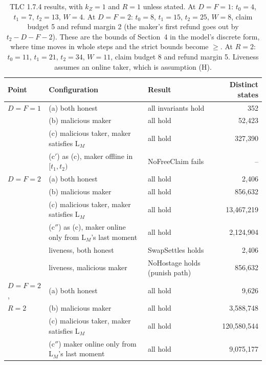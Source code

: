 \documentclass[10pt,letterpaper]{article}
\theoremstyle{plain}
\theoremstyle{definition}
\newcommand{\TLCa}{352}\newcommand{\TLCb}{52{,}423}\newcommand{\TLCc}{327{,}390}
\newcommand{\TLCda}{2{,}406}\newcommand{\TLCdl}{2{,}124{,}904}\newcommand{\TLCdb}{856{,}632}\newcommand{\TLCdc}{13{,}467{,}219}
\begin{document}
\begin{table}[H]
\centering\small
\begin{tabular}{@{}lllr@{}}
\toprule
\textbf{Point} & \textbf{Configuration} & \textbf{Result} & \textbf{Distinct states}\\
\midrule
$D=F=1$ & (a) both honest & all invariants hold & \TLCa\\
 & (b) malicious maker & all hold & \TLCb\\
 & (c) malicious taker, maker satisfies L$_M$ & all hold & \TLCc\\
 & (c$'$) as (c), maker offline in $[t_1,t_2)$ & NoFreeClaim fails & --\\
\midrule
$D=F=2$ & (a) both honest & all hold & \TLCda\\
 & (b) malicious maker & all hold & \TLCdb\\
 & (c) malicious taker, maker satisfies L$_M$ & all hold & \TLCdc\\
 & (c$''$) as (c), maker online only from L$_M$'s last moment & all hold & \TLCdl\\
 & liveness, both honest & SwapSettles holds & 2{,}406\\
 & liveness, malicious maker & NoHostage holds (punish path) & 856{,}632\\
\midrule
$D=F=2$, & (a) both honest & all hold & 9{,}626\\
$R=2$ & (b) malicious maker & all hold & 3{,}588{,}748\\
 & (c) malicious taker, maker satisfies L$_M$ & all hold & 120{,}580{,}544\\
 & (c$''$) maker online only from L$_M$'s last moment & all hold & 9{,}075{,}177\\
\bottomrule
\end{tabular}
\caption{TLC 1.7.4 results, with $k_Z=1$ and $R=1$ unless stated. At $D=F=1$: $t_0=4$, $t_1=7$, $t_2=13$, $W=4$. At
$D=F=2$: $t_0=8$, $t_1=15$, $t_2=25$, $W=8$, claim budget 5 and refund margin 2 (the maker's
first refund goes out by $t_2 - D - F - 2$). These are the bounds of Section~4 in the model's
discrete form, where time moves in whole steps and the strict bounds become $\ge$. At $R=2$:
$t_0=11$, $t_1=21$, $t_2=34$, $W=11$, claim budget 8 and refund margin 5. Liveness assumes an
online taker, which is assumption (H).}
\end{table}
\end{document}
